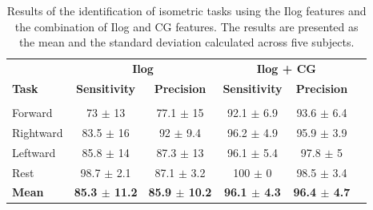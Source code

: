 \begin{table}[]
\centering
\caption{Results of the identification of isometric tasks using the Ilog features and the combination of Ilog and CG features. The results are presented as the mean and the standard deviation calculated across five subjects.}
\label{tb:4-1}
\begin{tabular}{lccccc}
 
              & \multicolumn{2}{c}{\textbf{Ilog}}                            & \multicolumn{2}{c}{\textbf{Ilog + CG}}                       \\
\textbf{Task} & \textbf{Sensitivity}     & \textbf{Precision}       & \textbf{Sensitivity}     & \textbf{Precision}       \\ \hline
                         &                                           &          &          &                   \\
Forward       & 73 $\pm$ 13              & 77.1 $\pm$ 15            & 92.1 $\pm$ 6.9           & 93.6 $\pm$ 6.4           \\
Rightward     & 83.5 $\pm$ 16            & 92 $\pm$ 9.4             & 96.2 $\pm$ 4.9           & 95.9 $\pm$ 3.9           \\
Leftward      & 85.8 $\pm$ 14            & 87.3 $\pm$ 13            & 96.1 $\pm$ 5.4           & 97.8 $\pm$ 5             \\
Rest          & 98.7 $\pm$ 2.1           & 87.1 $\pm$ 3.2           & 100 $\pm$ 0              & 98.5 $\pm$ 3.4           \\ 
\textbf{Mean} & \textbf{85.3 $\pm$ 11.2} & \textbf{85.9 $\pm$ 10.2} & \textbf{96.1 $\pm$  4.3} & \textbf{96.4  $\pm$ 4.7}
\end{tabular}
\end{table}

